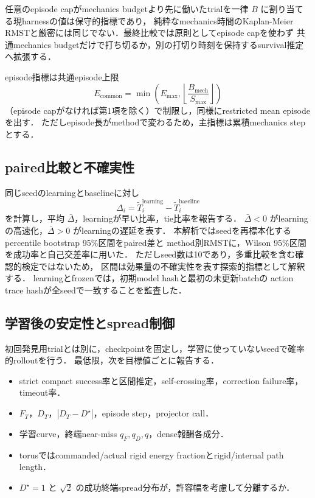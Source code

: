 \documentclass[a4paper,11pt]{ltjsarticle}
\newcommand{\abs}[1]{\left\lvert #1\right\rvert}
\begin{document}
任意のepisode capがmechanics budgetより先に働いたtrialを一律 $B$ に割り当てる現harnessの値は保守的指標であり，
純粋なmechanics時間のKaplan-Meier RMSTと厳密には同じでない．最終比較では原則としてepisode capを使わず
共通mechanics budgetだけで打ち切るか，別の打切り時刻を保持するsurvival推定へ拡張する．

episode指標は共通episode上限
\begin{equation}
 E_{\mathrm{common}}
 =\min\left(E_{\max},\left\lfloor\frac{B_{\mathrm{mech}}}{S_{\max}}\right\rfloor\right)
\end{equation}
（episode capがなければ第1項を除く）で制限し，同様にrestricted mean episodeを出す．
ただしepisode長がmethodで変わるため，主指標は累積mechanics stepとする．

\subsection{paired比較と不確実性}

同じseedのlearningとbaselineに対し
\begin{equation}
 \Delta_i=\widetilde T_i^{\mathrm{learning}}
 -\widetilde T_i^{\mathrm{baseline}}
\end{equation}
を計算し，平均 $\bar\Delta$，learningが早い比率，tie比率を報告する．
$\bar\Delta<0$ がlearningの高速化，$\bar\Delta>0$ がlearningの遅延を表す．
本解析ではseedを再標本化するpercentile bootstrap 95\%区間をpaired差と
method別RMSTに，Wilson 95\%区間を成功率と自己交差率に用いた．
ただしseed数は10であり，多重比較を含む確認的検定ではないため，
区間は効果量の不確実性を表す探索的指標として解釈する．
learningとfrozenでは，初期model hashと最初の未更新batchの
action trace hashが全seedで一致することを監査した．

\subsection{学習後の安定性とspread制御}

初回発見用trialとは別に，checkpointを固定し，学習に使っていないseedで確率的rolloutを行う．
最低限，次を目標値ごとに報告する．

\begin{itemize}
  \item strict compact success率と区間推定，self-crossing率，correction failure率，timeout率．
  \item $F_T$，$D_T$，$\abs{D_T-D^\star}$，episode step，projector call．
  \item 学習curve，終端near-miss $q_F,q_D,q$，dense報酬各成分．
  \item torusではcommanded/actual rigid energy fractionとrigid/internal path length．
  \item $D^\star=1$ と $\sqrt2$ の成功終端spread分布が，許容幅を考慮して分離するか．
\end{itemize}
\end{document}
